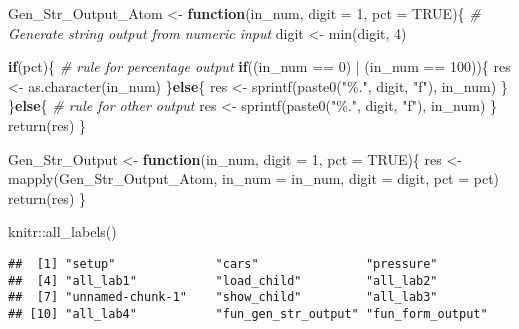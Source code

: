 \documentclass[
]{ctexart}
\newenvironment{Shaded}{\begin{snugshade}}{\end{snugshade}}
\newcommand{\AttributeTok}[1]{\textcolor[rgb]{0.77,0.63,0.00}{#1}}
\newcommand{\CommentTok}[1]{\textcolor[rgb]{0.56,0.35,0.01}{\textit{#1}}}
\newcommand{\ConstantTok}[1]{\textcolor[rgb]{0.00,0.00,0.00}{#1}}
\newcommand{\ControlFlowTok}[1]{\textcolor[rgb]{0.13,0.29,0.53}{\textbf{#1}}}
\newcommand{\DecValTok}[1]{\textcolor[rgb]{0.00,0.00,0.81}{#1}}
\newcommand{\FunctionTok}[1]{\textcolor[rgb]{0.00,0.00,0.00}{#1}}
\newcommand{\NormalTok}[1]{#1}
\newcommand{\OtherTok}[1]{\textcolor[rgb]{0.56,0.35,0.01}{#1}}
\newcommand{\SpecialCharTok}[1]{\textcolor[rgb]{0.00,0.00,0.00}{#1}}
\newcommand{\StringTok}[1]{\textcolor[rgb]{0.31,0.60,0.02}{#1}}
\begin{document}
\begin{Shaded}
\begin{Highlighting}[]
\NormalTok{Gen\_Str\_Output\_Atom }\OtherTok{\textless{}{-}} \ControlFlowTok{function}\NormalTok{(in\_num, }\AttributeTok{digit =} \DecValTok{1}\NormalTok{, }\AttributeTok{pct =} \ConstantTok{TRUE}\NormalTok{)\{}
    \CommentTok{\# Generate string output from numeric input}
\NormalTok{    digit }\OtherTok{\textless{}{-}} \FunctionTok{min}\NormalTok{(digit, }\DecValTok{4}\NormalTok{)}
    
    \ControlFlowTok{if}\NormalTok{(pct)\{ }\CommentTok{\# rule for \textasciigrave{}percentage\textasciigrave{} output}
        \ControlFlowTok{if}\NormalTok{((in\_num }\SpecialCharTok{==} \DecValTok{0}\NormalTok{) }\SpecialCharTok{|}\NormalTok{ (in\_num }\SpecialCharTok{==} \DecValTok{100}\NormalTok{))\{}
\NormalTok{            res }\OtherTok{\textless{}{-}} \FunctionTok{as.character}\NormalTok{(in\_num)}
\NormalTok{        \}}\ControlFlowTok{else}\NormalTok{\{}
\NormalTok{            res }\OtherTok{\textless{}{-}} \FunctionTok{sprintf}\NormalTok{(}\FunctionTok{paste0}\NormalTok{(}\StringTok{"\%."}\NormalTok{, digit, }\StringTok{"f"}\NormalTok{), in\_num)}
\NormalTok{        \}}
\NormalTok{    \}}\ControlFlowTok{else}\NormalTok{\{ }\CommentTok{\# rule for other output}
\NormalTok{        res }\OtherTok{\textless{}{-}} \FunctionTok{sprintf}\NormalTok{(}\FunctionTok{paste0}\NormalTok{(}\StringTok{"\%."}\NormalTok{, digit, }\StringTok{"f"}\NormalTok{), in\_num)}
\NormalTok{    \}}
    \FunctionTok{return}\NormalTok{(res)}
\NormalTok{\}}

\NormalTok{Gen\_Str\_Output }\OtherTok{\textless{}{-}} \ControlFlowTok{function}\NormalTok{(in\_num, }\AttributeTok{digit =} \DecValTok{1}\NormalTok{, }\AttributeTok{pct =} \ConstantTok{TRUE}\NormalTok{)\{}
\NormalTok{    res }\OtherTok{\textless{}{-}} \FunctionTok{mapply}\NormalTok{(Gen\_Str\_Output\_Atom, }\AttributeTok{in\_num =}\NormalTok{ in\_num, }\AttributeTok{digit =}\NormalTok{ digit, }\AttributeTok{pct =}\NormalTok{ pct)}
    \FunctionTok{return}\NormalTok{(res)}
\NormalTok{\}}
\end{Highlighting}
\end{Shaded}

\begin{Shaded}
\begin{Highlighting}[]
\NormalTok{knitr}\SpecialCharTok{::}\FunctionTok{all\_labels}\NormalTok{()}
\end{Highlighting}
\end{Shaded}

\begin{verbatim}
##  [1] "setup"              "cars"               "pressure"          
##  [4] "all_lab1"           "load_child"         "all_lab2"          
##  [7] "unnamed-chunk-1"    "show_child"         "all_lab3"          
## [10] "all_lab4"           "fun_gen_str_output" "fun_form_output"
\end{verbatim}
\end{document}
